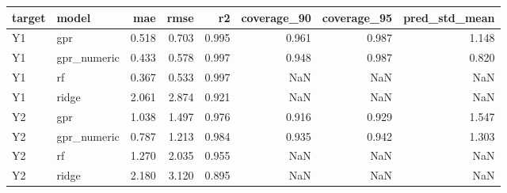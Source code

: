 \begin{tabular}{llrrrrrr}
\toprule
target & model & mae & rmse & r2 & coverage_90 & coverage_95 & pred_std_mean \\
\midrule
Y1 & gpr & 0.518 & 0.703 & 0.995 & 0.961 & 0.987 & 1.148 \\
Y1 & gpr_numeric & 0.433 & 0.578 & 0.997 & 0.948 & 0.987 & 0.820 \\
Y1 & rf & 0.367 & 0.533 & 0.997 & NaN & NaN & NaN \\
Y1 & ridge & 2.061 & 2.874 & 0.921 & NaN & NaN & NaN \\
Y2 & gpr & 1.038 & 1.497 & 0.976 & 0.916 & 0.929 & 1.547 \\
Y2 & gpr_numeric & 0.787 & 1.213 & 0.984 & 0.935 & 0.942 & 1.303 \\
Y2 & rf & 1.270 & 2.035 & 0.955 & NaN & NaN & NaN \\
Y2 & ridge & 2.180 & 3.120 & 0.895 & NaN & NaN & NaN \\
\bottomrule
\end{tabular}
